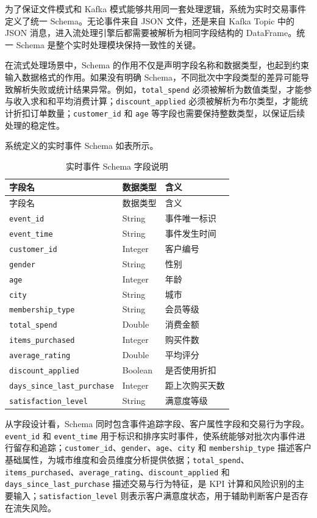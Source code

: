 \documentclass[12pt,hyperref,a4paper,UTF8]{ctexart}
\begin{document}
为了保证文件模式和 Kafka 模式能够共用同一套处理逻辑，系统为实时交易事件定义了统一 Schema。无论事件来自 JSON 文件，还是来自 Kafka Topic 中的 JSON 消息，进入流处理引擎后都需要被解析为相同字段结构的 DataFrame。统一 Schema 是整个实时处理模块保持一致性的关键。

在流式处理场景中，Schema 的作用不仅是声明字段名称和数据类型，也起到约束输入数据格式的作用。如果没有明确 Schema，不同批次中字段类型的差异可能导致解析失败或统计结果异常。例如，\texttt{total\_spend} 必须被解析为数值类型，才能参与收入求和和平均消费计算；\texttt{discount\_applied} 必须被解析为布尔类型，才能统计折扣订单数量；\texttt{customer\_id} 和 \texttt{age} 等字段也需要保持整数类型，以保证后续处理的稳定性。

系统定义的实时事件 Schema 如表所示。

\begin{longtable}{lll}
\caption{实时事件 Schema 字段说明} \\
\toprule
字段名 & 数据类型 & 含义 \\
\midrule
\endfirsthead
\toprule
字段名 & 数据类型 & 含义 \\
\midrule
\endhead
\texttt{event\_id} & String & 事件唯一标识 \\
\texttt{event\_time} & String & 事件发生时间 \\
\texttt{customer\_id} & Integer & 客户编号 \\
\texttt{gender} & String & 性别 \\
\texttt{age} & Integer & 年龄 \\
\texttt{city} & String & 城市 \\
\texttt{membership\_type} & String & 会员等级 \\
\texttt{total\_spend} & Double & 消费金额 \\
\texttt{items\_purchased} & Integer & 购买件数 \\
\texttt{average\_rating} & Double & 平均评分 \\
\texttt{discount\_applied} & Boolean & 是否使用折扣 \\
\texttt{days\_since\_last\_purchase} & Integer & 距上次购买天数 \\
\texttt{satisfaction\_level} & String & 满意度等级 \\
\bottomrule
\end{longtable}

从字段设计看，Schema 同时包含事件追踪字段、客户属性字段和交易行为字段。\texttt{event\_id} 和 \texttt{event\_time} 用于标识和排序实时事件，使系统能够对批次内事件进行留存和追踪；\texttt{customer\_id}、\texttt{gender}、\texttt{age}、\texttt{city} 和 \texttt{membership\_type} 描述客户基础属性，为城市维度和会员维度分析提供依据；\texttt{total\_spend}、\texttt{items\_purchased}、\texttt{average\_rating}、\texttt{discount\_applied} 和 \texttt{days\_since\_last\_purchase} 描述交易与行为特征，是 KPI 计算和风险识别的主要输入；\texttt{satisfaction\_level} 则表示客户满意度状态，用于辅助判断客户是否存在流失风险。
\end{document}
